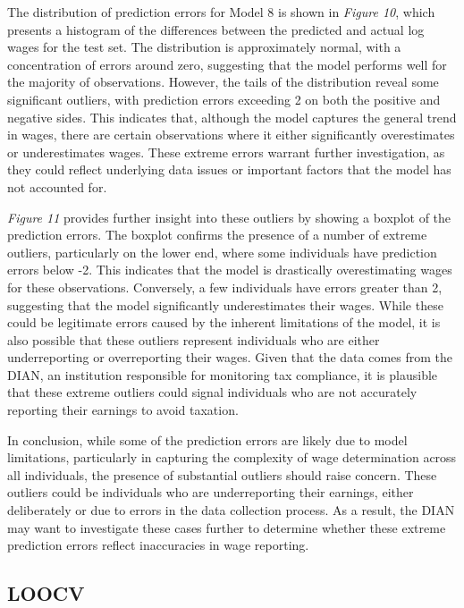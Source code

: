 \documentclass[11pt,a4paper,onecolumn]{article}
\begin{document}
        The distribution of prediction errors for Model 8 is shown in \textit{Figure 10}, which presents a histogram of the differences between the predicted and actual log wages for the test set. The distribution is approximately normal, with a concentration of errors around zero, suggesting that the model performs well for the majority of observations. However, the tails of the distribution reveal some significant outliers, with prediction errors exceeding 2 on both the positive and negative sides. This indicates that, although the model captures the general trend in wages, there are certain observations where it either significantly overestimates or underestimates wages. These extreme errors warrant further investigation, as they could reflect underlying data issues or important factors that the model has not accounted for.

        \textit{Figure 11} provides further insight into these outliers by showing a boxplot of the prediction errors. The boxplot confirms the presence of a number of extreme outliers, particularly on the lower end, where some individuals have prediction errors below -2. This indicates that the model is drastically overestimating wages for these observations. Conversely, a few individuals have errors greater than 2, suggesting that the model significantly underestimates their wages. While these could be legitimate errors caused by the inherent limitations of the model, it is also possible that these outliers represent individuals who are either underreporting or overreporting their wages. Given that the data comes from the DIAN, an institution responsible for monitoring tax compliance, it is plausible that these extreme outliers could signal individuals who are not accurately reporting their earnings to avoid taxation.
        
        In conclusion, while some of the prediction errors are likely due to model limitations, particularly in capturing the complexity of wage determination across all individuals, the presence of substantial outliers should raise concern. These outliers could be individuals who are underreporting their earnings, either deliberately or due to errors in the data collection process. As a result, the DIAN may want to investigate these cases further to determine whether these extreme prediction errors reflect inaccuracies in wage reporting.

    \subsection{LOOCV}
    
\end{document}

